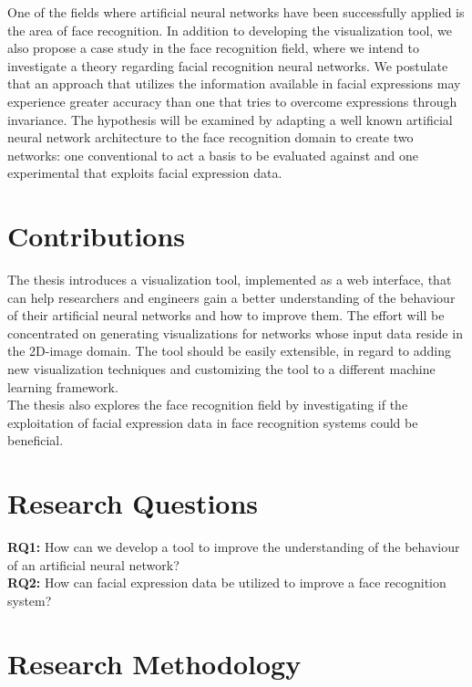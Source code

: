 \noindent One of the fields where artificial neural networks have been successfully applied is the area of face recognition. In addition to developing the visualization tool, we also propose a case study in the face recognition field, where we intend to investigate a theory regarding facial recognition neural networks. We postulate that an approach that utilizes the information available in facial expressions may experience greater accuracy than one that tries to overcome expressions through invariance. The hypothesis will be examined by adapting a well known artificial neural network architecture to the face recognition domain to create two networks: one conventional to act a basis to be evaluated against and one experimental that exploits facial expression data. \\

\section{Contributions}

The thesis introduces a visualization tool, implemented as a web interface, that can help researchers and engineers gain a better understanding of the behaviour of their artificial neural networks and how to improve them. The effort will be concentrated on generating visualizations for networks whose input data reside in the 2D-image domain. The tool should be easily extensible, in regard to adding new visualization techniques and customizing the tool to a different machine learning framework. \\

\noindent The thesis also explores the face recognition field by investigating if the exploitation of facial expression data in face recognition systems could be beneficial.

\section{Research Questions}

\textbf{RQ1:} How can we develop a tool to improve the understanding of the behaviour of an artificial neural network? \\
\textbf{RQ2:} How can facial expression data be utilized to improve a face recognition system?

\section{Research Methodology}

